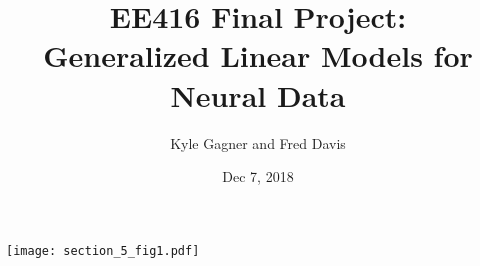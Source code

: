 \documentclass[letterpaper,titlepage,10pt]{article}
\title{EE416 Final Project:\\Generalized Linear Models for Neural Data}
\date{Dec 7, 2018}
\author{Kyle Gagner and Fred Davis}
\begin{document}
\maketitle
\texttt{[image: section\_5\_fig1.pdf]}
\end{document}

